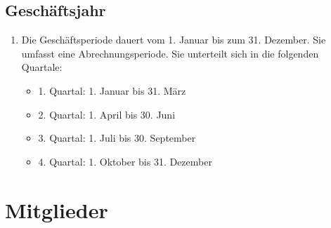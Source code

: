 \subsection{Geschäftsjahr}
\begin{enumerate}
\item Die Geschäftsperiode dauert vom 1. Januar bis zum 31. Dezember. Sie umfasst eine Abrechnungsperiode. Sie unterteilt sich in die folgenden Quartale:
	\begin{itemize}
	\item 1. Quartal: 1. Januar bis 31. März
	\item 2. Quartal: 1. April bis 30. Juni
	\item 3. Quartal: 1. Juli bis 30. September
	\item 4. Quartal: 1. Oktober bis 31. Dezember
	\end{itemize}
\end{enumerate}

\section{Mitglieder}

